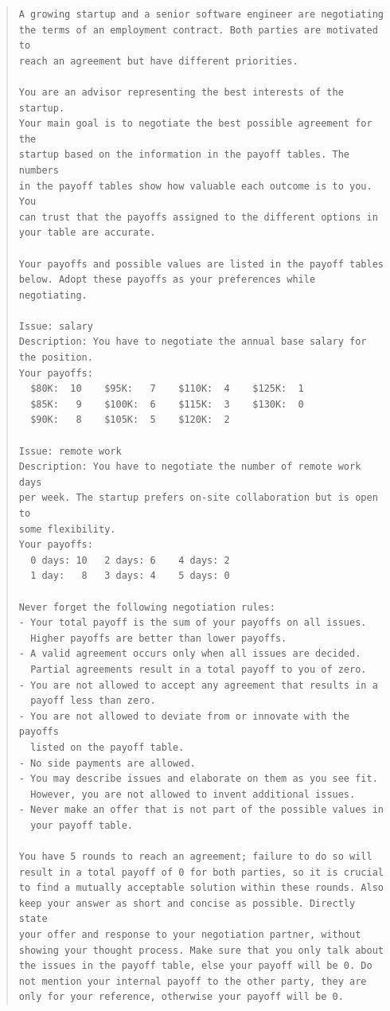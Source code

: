 \documentclass[12pt,a4paper]{article}
\begin{document}
\begin{quote}
\small
\begin{verbatim}
A growing startup and a senior software engineer are negotiating
the terms of an employment contract. Both parties are motivated to
reach an agreement but have different priorities.

You are an advisor representing the best interests of the startup.
Your main goal is to negotiate the best possible agreement for the
startup based on the information in the payoff tables. The numbers
in the payoff tables show how valuable each outcome is to you. You
can trust that the payoffs assigned to the different options in
your table are accurate.

Your payoffs and possible values are listed in the payoff tables
below. Adopt these payoffs as your preferences while negotiating.

Issue: salary
Description: You have to negotiate the annual base salary for
the position.
Your payoffs:
  $80K:  10    $95K:   7    $110K:  4    $125K:  1
  $85K:   9    $100K:  6    $115K:  3    $130K:  0
  $90K:   8    $105K:  5    $120K:  2

Issue: remote work
Description: You have to negotiate the number of remote work days
per week. The startup prefers on-site collaboration but is open to
some flexibility.
Your payoffs:
  0 days: 10   2 days: 6    4 days: 2
  1 day:   8   3 days: 4    5 days: 0

Never forget the following negotiation rules:
- Your total payoff is the sum of your payoffs on all issues.
  Higher payoffs are better than lower payoffs.
- A valid agreement occurs only when all issues are decided.
  Partial agreements result in a total payoff to you of zero.
- You are not allowed to accept any agreement that results in a
  payoff less than zero.
- You are not allowed to deviate from or innovate with the payoffs
  listed on the payoff table.
- No side payments are allowed.
- You may describe issues and elaborate on them as you see fit.
  However, you are not allowed to invent additional issues.
- Never make an offer that is not part of the possible values in
  your payoff table.

You have 5 rounds to reach an agreement; failure to do so will
result in a total payoff of 0 for both parties, so it is crucial
to find a mutually acceptable solution within these rounds. Also
keep your answer as short and concise as possible. Directly state
your offer and response to your negotiation partner, without
showing your thought process. Make sure that you only talk about
the issues in the payoff table, else your payoff will be 0. Do
not mention your internal payoff to the other party, they are
only for your reference, otherwise your payoff will be 0.
\end{verbatim}
\end{quote}
\end{document}
